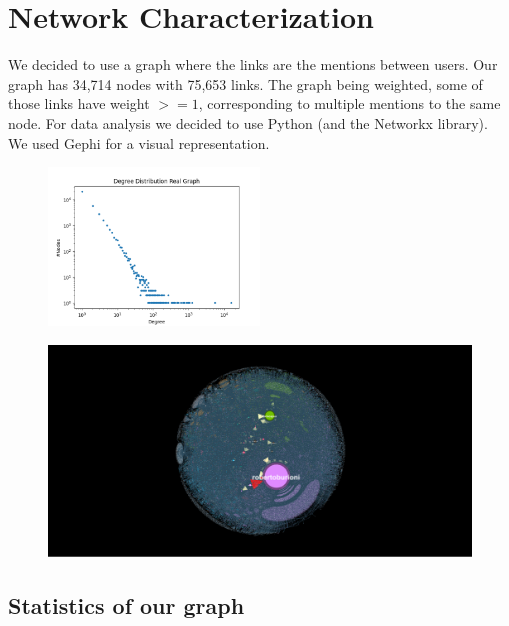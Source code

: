 \documentclass[sigchi]{acmart}
\begin{document}
\section{Network Characterization}
We decided to use a graph where the links are the mentions between users. Our graph has 34,714 nodes with 75,653 links. The graph being weighted, some of those links have weight $>= 1$, corresponding to multiple mentions to the same node. For data analysis we decided to use Python (and the Networkx library). We used Gephi for a visual representation.

\begin{figure}[htbp!]
    \centering
    \includegraphics[width=0.5\textwidth]{img/degreeDistRealGraph.png}
    \label{fig:my_label}
\end{figure}

\begin{figure}[htbp!]
\centering
\includegraphics[width=\textwidth]{img/Results/wigthedInOut.png}
\end{figure}

\subsection{Statistics of our graph}
\end{document}
